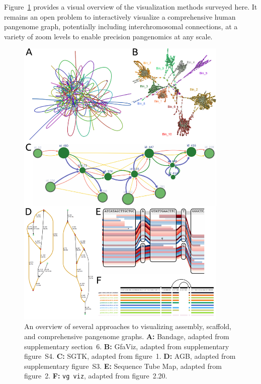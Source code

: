 Figure~\ref{fig:visualization} provides a visual overview of the visualization methods surveyed here.
It remains an open problem to interactively visualize a comprehensive human pangenome graph, potentially including interchromosomal connections, at a variety of zoom levels to enable precision pangenomics at any scale.

\begin{figure}[h]
    \includegraphics[width=0.9\textwidth]{figures/visualization.pdf}
    \caption{\label{fig:visualization} An overview of several approaches to visualizing assembly, scaffold, and comprehensive pangenome graphs.
\textbf{A:} Bandage, adapted from \cite{Wick_2015} supplementary section~6.
\textbf{B:} GfaViz, adapted from \cite{Gonnella_2018} supplementary figure~S4.
\textbf{C:} SGTK, adapted from \cite{Kunyavskaya_2018} figure~1.
\textbf{D:} AGB, adapted from \cite{Mikheenko_2019} supplementary figure~S3.
\textbf{E:} Sequence Tube Map, adapted from \cite{Beyer_2019} figure~2.
\textbf{F:} \texttt{vg viz}, adapted from \cite{Garrison_2019} figure~2.20.}
\end{figure}

